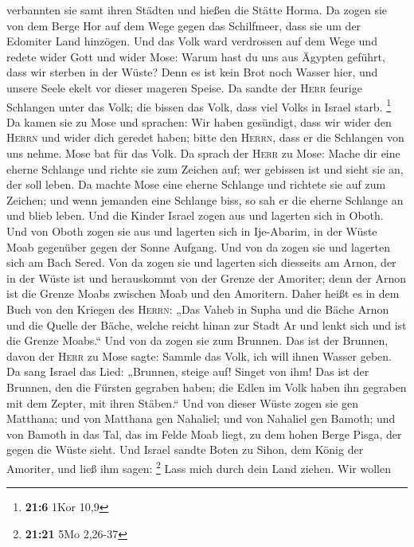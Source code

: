 verbannten sie samt ihren Städten und hießen die Stätte Horma.
 Da zogen sie von dem Berge Hor auf dem Wege gegen das
Schilfmeer, dass sie um der Edomiter Land hinzögen. Und das Volk ward
verdrossen auf dem Wege  und redete wider Gott und wider
Mose: Warum hast du uns aus Ägypten geführt, dass wir sterben in der
Wüste? Denn es ist kein Brot noch Wasser hier, und unsere Seele ekelt
vor dieser mageren Speise.  Da sandte der \textsc{Herr}
feurige Schlangen unter das Volk; die bissen das Volk, dass viel Volks
in Israel starb. \footnote{\textbf{21:6} 1Kor 10,9}  Da
kamen sie zu Mose und sprachen: Wir haben gesündigt, dass wir wider den
\textsc{Herrn} und wider dich geredet haben; bitte den \textsc{Herrn},
dass er die Schlangen von uns nehme. Mose bat für das Volk.
 Da sprach der \textsc{Herr} zu Mose: Mache dir eine
eherne Schlange und richte sie zum Zeichen auf; wer gebissen ist und
sieht sie an, der soll leben.  Da machte Mose eine eherne
Schlange und richtete sie auf zum Zeichen; und wenn jemanden eine
Schlange biss, so sah er die eherne Schlange an und blieb leben.
 Und die Kinder Israel zogen aus und lagerten sich in
Oboth.  Und von Oboth zogen sie aus und lagerten sich in
Ije-Abarim, in der Wüste Moab gegenüber gegen der Sonne Aufgang.
 Und von da zogen sie und lagerten sich am Bach Sered.
 Von da zogen sie und lagerten sich diesseits am Arnon,
der in der Wüste ist und herauskommt von der Grenze der Amoriter; denn
der Arnon ist die Grenze Moabs zwischen Moab und den Amoritern.
 Daher heißt es in dem Buch von den Kriegen des
\textsc{Herrn}: „Das Vaheb in Supha und die Bäche Arnon 
und die Quelle der Bäche, welche reicht hinan zur Stadt Ar und lenkt
sich und ist die Grenze Moabs.``  Und von da zogen sie
zum Brunnen. Das ist der Brunnen, davon der \textsc{Herr} zu Mose sagte:
Sammle das Volk, ich will ihnen Wasser geben.  Da sang
Israel das Lied: „Brunnen, steige auf! Singet von ihm! 
Das ist der Brunnen, den die Fürsten gegraben haben; die Edlen im Volk
haben ihn gegraben mit dem Zepter, mit ihren Stäben.`` Und von dieser
Wüste zogen sie gen Matthana;  und von Matthana gen
Nahaliel; und von Nahaliel gen Bamoth;  und von Bamoth in
das Tal, das im Felde Moab liegt, zu dem hohen Berge Pisga, der gegen
die Wüste sieht.  Und Israel sandte Boten zu Sihon, dem
König der Amoriter, und ließ ihm sagen: \footnote{\textbf{21:21} 5Mo
  2,26-37}  Lass mich durch dein Land ziehen. Wir wollen

